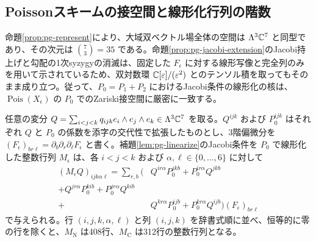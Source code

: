 \subsection{Poissonスキームの接空間と線形化行列の階数}
命題\ref{prop:pg-represent}により、大域双ベクトル場全体の空間は $\Lambda^3\mathbb C^7$ と同型であり、その次元は $\binom{7}{3}=35$ である。命題\ref{prop:pg-jacobi-extension}のJacobi持上げと勾配の1次syzygyの消滅は、固定した $F_\epsilon$ に対する線形写像と完全列のみを用いて示されているため、双対数環 $\mathbb C[\varepsilon]/(\varepsilon^2)$ とのテンソル積を取ってもそのまま成り立つ。従って、$P_0=P_1+P_2$ におけるJacobi条件の線形化の核は、$\operatorname{Pois}(X_\epsilon)$ の $P_0$ でのZariski接空間に厳密に一致する。

任意の変分 $Q=\sum_{i<j<k}q_{ijk}e_i\wedge e_j\wedge e_k\in\Lambda^3\mathbb C^7$ を取る。$Q^{ijk}$ および $P_0^{ijk}$ はそれぞれ $Q$ と $P_0$ の係数を添字の交代性で拡張したものとし、3階偏微分を $(F_\epsilon)_{br\ell}=\partial_b\partial_r\partial_\ell F_\epsilon$ と書く。補題\ref{lem:pg-linearize}のJacobi条件を $P_0$ で線形化した整数行列 $M_\epsilon$ は、各 $i<j<k$ および $\alpha,\ell\in\{0,\ldots,6\}$ に対して
\begin{equation}\label{ne:M}
\begin{split}
(M_\epsilon Q)_{ijk\alpha\ell}=\sum_{r,b}\bigl(&Q^{ir\alpha}P_0^{jkb}+P_0^{ir\alpha}Q^{jkb}\\
+Q^{jr\alpha}P_0^{kib}+P_0^{jr\alpha}Q^{kib}\\
+&Q^{kr\alpha}P_0^{ijb}+P_0^{kr\alpha}Q^{ijb}\bigr)(F_\epsilon)_{br\ell}
\end{split}
\end{equation}
で与えられる。行 $(i,j,k,\alpha,\ell)$ と列 $(i,j,k)$ を辞書式順に並べ、恒等的に零の行を除くと、$M_{\mathrm N}$ は408行、$M_{\mathrm C}$ は312行の整数行列となる。

